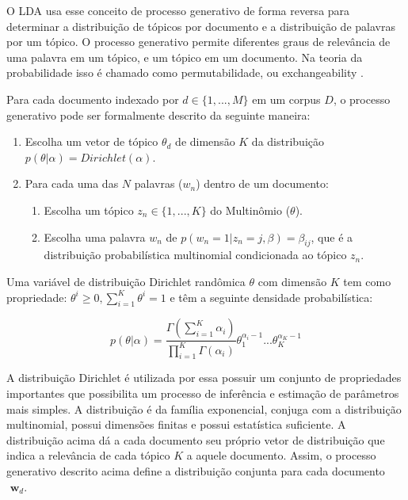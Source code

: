 \documentclass[12pt,a4paper]{article}
\begin{document}
 O LDA usa esse conceito de processo generativo de forma reversa para determinar a distribuição de tópicos por documento e a distribuição de palavras por um tópico. 
 O processo generativo permite diferentes graus de relevância de uma palavra em um tópico, e um tópico em um documento. Na teoria da probabilidade isso é chamado como permutabilidade,
 ou exchangeability \cite{aldous1985exchangeability}. 
 
 Para cada documento indexado por $d \in \{1,. . . , M\}$ em um corpus $D$, o processo generativo pode ser formalmente descrito da seguinte maneira:


\begin{enumerate}
  \item Escolha um vetor de tópico $\theta _d$ de dimensão $K$ da distribuição $p(\theta|\alpha)=Dirichlet(\alpha)$.
  \item Para cada uma das $N$ palavras ($w_n$) dentro de um documento:
  \begin{enumerate}
  	\item Escolha um tópico \(z_n \in \{1,. . . , K\}\) do Multinômio ($\theta$).
    \item Escolha uma palavra $w_n$ de \(p(w_n=1| z_n=j,\beta)=\beta _{ij}\), que é a distribuição probabilística multinomial condicionada ao tópico $z_n$.
  \end{enumerate}
\end{enumerate}


Uma variável de distribuição Dirichlet randômica $\theta$ com dimensão $K$ tem como propriedade: $\theta ^i \geq 0, \displaystyle\sum_{i=1}^{K} \theta ^i = 1$ e têm a seguinte densidade probabilística:

\begin{equation}
p(\theta|\alpha) = \frac{\Gamma(\displaystyle\sum_{i=1}^{K} \alpha _i)}{\displaystyle\prod_{i=1}^{K} \Gamma(\alpha _i)} \theta _1 ^{\alpha _i - 1} ...  \theta _K ^{\alpha _K - 1}
\end{equation}

A distribuição Dirichlet é utilizada por essa possuir um conjunto de propriedades importantes que possibilita um processo de inferência e estimação de parâmetros mais simples.
 A distribuição é da família exponencial, conjuga com a distribuição multinomial, possui dimensões finitas e possui estatística suficiente.
 A distribuição  acima dá a cada documento seu próprio vetor de distribuição que indica a relevância de cada tópico $K$ a aquele documento.
 Assim, o processo generativo descrito acima define a distribuição conjunta para cada documento $\textbf{ w}_d$.
\end{document}
